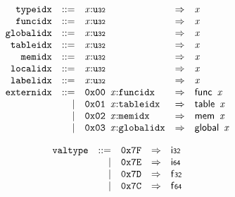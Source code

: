 $$
\begin{array}{@{}l@{}rrlll@{}l@{}}
& {\mathtt{typeidx}} &::=& {\mathit{x}}{:}{\mathtt{u{\scriptstyle32}}} &\Rightarrow& {\mathit{x}} \\
& {\mathtt{funcidx}} &::=& {\mathit{x}}{:}{\mathtt{u{\scriptstyle32}}} &\Rightarrow& {\mathit{x}} \\
& {\mathtt{globalidx}} &::=& {\mathit{x}}{:}{\mathtt{u{\scriptstyle32}}} &\Rightarrow& {\mathit{x}} \\
& {\mathtt{tableidx}} &::=& {\mathit{x}}{:}{\mathtt{u{\scriptstyle32}}} &\Rightarrow& {\mathit{x}} \\
& {\mathtt{memidx}} &::=& {\mathit{x}}{:}{\mathtt{u{\scriptstyle32}}} &\Rightarrow& {\mathit{x}} \\
& {\mathtt{localidx}} &::=& {\mathit{x}}{:}{\mathtt{u{\scriptstyle32}}} &\Rightarrow& {\mathit{x}} \\
& {\mathtt{labelidx}} &::=& {\mathit{x}}{:}{\mathtt{u{\scriptstyle32}}} &\Rightarrow& {\mathit{x}} \\
& {\mathtt{externidx}} &::=& \mathtt{0x00}~\,{\mathit{x}}{:}{\mathtt{funcidx}} &\Rightarrow& \mathsf{func}~\,{\mathit{x}} \\ &&|&
\mathtt{0x01}~\,{\mathit{x}}{:}{\mathtt{tableidx}} &\Rightarrow& \mathsf{table}~\,{\mathit{x}} \\ &&|&
\mathtt{0x02}~\,{\mathit{x}}{:}{\mathtt{memidx}} &\Rightarrow& \mathsf{mem}~\,{\mathit{x}} \\ &&|&
\mathtt{0x03}~\,{\mathit{x}}{:}{\mathtt{globalidx}} &\Rightarrow& \mathsf{global}~\,{\mathit{x}} \\
\end{array}
$$

\vspace{1ex}

\vspace{1ex}

$$
\begin{array}{@{}l@{}rrlll@{}l@{}}
& {\mathtt{valtype}} &::=& \mathtt{0x7F} &\Rightarrow& \mathsf{i{\scriptstyle32}} \\ &&|&
\mathtt{0x7E} &\Rightarrow& \mathsf{i{\scriptstyle64}} \\ &&|&
\mathtt{0x7D} &\Rightarrow& \mathsf{f{\scriptstyle32}} \\ &&|&
\mathtt{0x7C} &\Rightarrow& \mathsf{f{\scriptstyle64}} \\
\end{array}
$$

\vspace{1ex}

